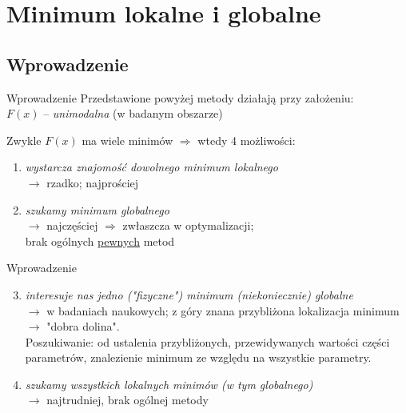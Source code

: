 \section{Minimum lokalne i globalne}

\subsection{Wprowadzenie}

  \begin{frame}{Wprowadzenie}
    Przedstawione powyżej metody działają przy założeniu:\\
    $F(x)$ -- \emph{unimodalna} (w badanym obszarze)
    \begin{block}{Zwykle $F(x)$ ma wiele minimów $\Rightarrow$ wtedy 4 możliwości:}
      \begin{enumerate}
        \item \emph{wystarcza znajomość dowolnego minimum lokalnego}\\
        $\to$ rzadko; najprościej
        \item \emph{szukamy minimum globalnego}\\
        $\to$ najczęściej $\Rightarrow$ zwłaszcza w optymalizacji;\\
        brak ogólnych \underline{pewnych} metod

      \end{enumerate}
    \end{block}
  \end{frame}

  \begin{frame}{Wprowadzenie}
    \begin{block}{}
      \begin{enumerate}
        \setcounter{enumi}{2}
        \item \emph{interesuje nas jedno ("fizyczne") minimum
        (niekoniecznie) globalne}\\
        $\to$ w badaniach naukowych; z góry znana przybliżona
        lokalizacja minimum $\to$ "dobra dolina". \\
        Poszukiwanie: od ustalenia przybliżonych, przewidywanych
        wartości części parametrów, znalezienie minimum ze
        względu na wszystkie parametry.
        \item \emph{szukamy wszystkich lokalnych minimów
        (w tym globalnego)} \\
        $\to$ najtrudniej, brak ogólnej metody
      \end{enumerate}
    \end{block}
  \end{frame}

